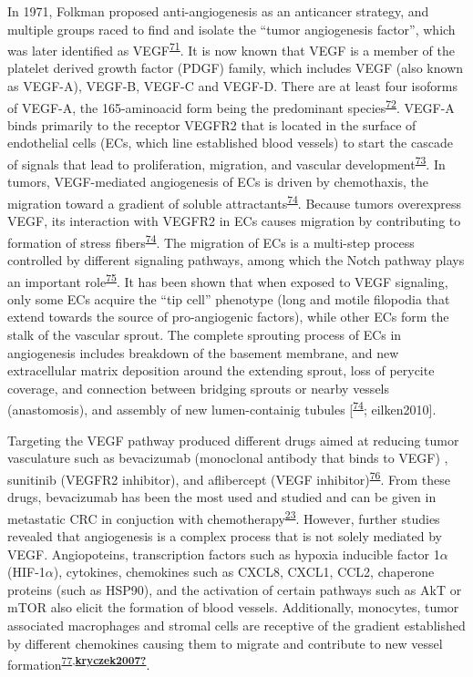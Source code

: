 \documentclass[11pt]{umnthesis}
\begin{document}
In 1971, Folkman proposed anti-angiogenesis as an anticancer strategy, and multiple groups raced to find and isolate the ``tumor angiogenesis factor'', which was later identified as VEGF\textsuperscript{\protect\hyperlink{ref-ferrara2004}{71}}. It is now known that VEGF is a member of the platelet derived growth factor (PDGF) family, which includes VEGF (also known as VEGF-A), VEGF-B, VEGF-C and VEGF-D. There are at least four isoforms of VEGF-A, the 165-aminoacid form being the predominant species\textsuperscript{\protect\hyperlink{ref-carmeliet2005}{72}}. VEGF-A binds primarily to the receptor VEGFR2 that is located in the surface of endothelial cells (ECs, which line established blood vessels) to start the cascade of signals that lead to proliferation, migration, and vascular development\textsuperscript{\protect\hyperlink{ref-apte2019}{73}}.
In tumors, VEGF-mediated angiogenesis of ECs is driven by chemothaxis, the migration toward a gradient of soluble attractants\textsuperscript{\protect\hyperlink{ref-lamalice2007}{74}}. Because tumors overexpress VEGF, its interaction with VEGFR2 in ECs causes migration by contributing to formation of stress fibers\textsuperscript{\protect\hyperlink{ref-lamalice2007}{74}}. The migration of ECs is a multi-step process controlled by different signaling pathways, among which the Notch pathway plays an important role\textsuperscript{\protect\hyperlink{ref-eilken2010}{75}}. It has been shown that when exposed to VEGF signaling, only some ECs acquire the ``tip cell'' phenotype (long and motile filopodia that extend towards the source of pro-angiogenic factors), while other ECs form the stalk of the vascular sprout.
The complete sprouting process of ECs in angiogenesis includes breakdown of the basement membrane, and new extracellular matrix deposition around the extending sprout, loss of perycite coverage, and connection between bridging sprouts or nearby vessels (anastomosis), and assembly of new lumen-containig tubules {[}\textsuperscript{\protect\hyperlink{ref-lamalice2007}{74}}; eilken2010{]}.

Targeting the VEGF pathway produced different drugs aimed at reducing tumor vasculature such as bevacizumab (monoclonal antibody that binds to VEGF) , sunitinib (VEGFR2 inhibitor), and aflibercept (VEGF inhibitor)\textsuperscript{\protect\hyperlink{ref-vasudev2014}{76}}. From these drugs, bevacizumab has been the most used and studied and can be given in metastatic CRC in conjuction with chemotherapy\textsuperscript{\protect\hyperlink{ref-benson2018}{23}}. However, further studies revealed that angiogenesis is a complex process that is not solely mediated by VEGF. Angiopoteins, transcription factors such as hypoxia inducible factor 1\(\alpha\) (HIF-1\(\alpha\)), cytokines, chemokines such as CXCL8, CXCL1, CCL2, chaperone proteins (such as HSP90), and the activation of certain pathways such as AkT or mTOR also elicit the formation of blood vessels. Additionally, monocytes, tumor associated macrophages and stromal cells are receptive of the gradient established by different chemokines causing them to migrate and contribute to new vessel formation\textsuperscript{\protect\hyperlink{ref-yaddanapudi2017}{77},\protect\hyperlink{ref-kryczek2007}{\textbf{kryczek2007?}}}.
\end{document}
